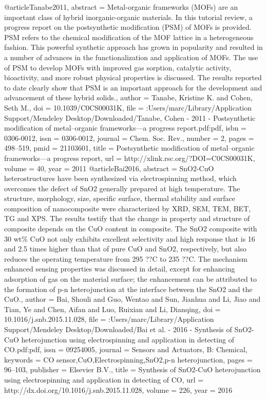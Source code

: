 @article{Tanabe2011,
abstract = {Metal-organic frameworks (MOFs) are an important class of hybrid inorganic-organic materials. In this tutorial review, a progress report on the postsynthetic modification (PSM) of MOFs is provided. PSM refers to the chemical modification of the MOF lattice in a heterogeneous fashion. This powerful synthetic approach has grown in popularity and resulted in a number of advances in the functionalization and application of MOFs. The use of PSM to develop MOFs with improved gas sorption, catalytic activity, bioactivity, and more robust physical properties is discussed. The results reported to date clearly show that PSM is an important approach for the development and advancement of these hybrid solids.},
author = {Tanabe, Kristine K. and Cohen, Seth M.},
doi = {10.1039/C0CS00031K},
file = {:Users/marc/Library/Application Support/Mendeley Desktop/Downloaded/Tanabe, Cohen - 2011 - Postsynthetic modification of metal–organic frameworks—a progress report.pdf:pdf},
isbn = {0306-0012},
issn = {0306-0012},
journal = {Chem. Soc. Rev.},
number = {2},
pages = {498--519},
pmid = {21103601},
title = {{Postsynthetic modification of metal–organic frameworks—a progress report}},
url = {http://xlink.rsc.org/?DOI=C0CS00031K},
volume = {40},
year = {2011}
}
@article{Bai2016,
abstract = {SnO2-CuO heterostructures have been synthesized via electrospinning method, which overcomes the defect of SnO2 generally prepared at high temperature. The structure, morphology, size, specific surface, thermal stability and surface composition of nanocomposite were characterized by XRD, SEM, TEM, BET, TG and XPS. The results testify that the change in property and structure of composite depends on the CuO content in composite. The SnO2 composite with 30 wt{\%} CuO not only exhibits excellent selectivity and high response that is 16 and 2.5 times higher than that of pure CuO and SnO2, respectively, but also reduces the operating temperature from 295 ??C to 235 ??C. The mechanism enhanced sensing properties was discussed in detail, except for enhancing adsorption of gas on the material surface; the enhancement can be attributed to the formation of p-n heterojunction at the interface between the SnO2 and the CuO.},
author = {Bai, Shouli and Guo, Wentao and Sun, Jianhua and Li, Jiao and Tian, Ye and Chen, Aifan and Luo, Ruixian and Li, Dianqing},
doi = {10.1016/j.snb.2015.11.028},
file = {:Users/marc/Library/Application Support/Mendeley Desktop/Downloaded/Bai et al. - 2016 - Synthesis of SnO2-CuO heterojunction using electrospinning and application in detecting of CO.pdf:pdf},
issn = {09254005},
journal = {Sensors and Actuators, B: Chemical},
keywords = {CO sensor,CuO,Electrospinning,SnO2,p-n heterojunction},
pages = {96--103},
publisher = {Elsevier B.V.},
title = {{Synthesis of SnO2-CuO heterojunction using electrospinning and application in detecting of CO}},
url = {http://dx.doi.org/10.1016/j.snb.2015.11.028},
volume = {226},
year = {2016}
}

